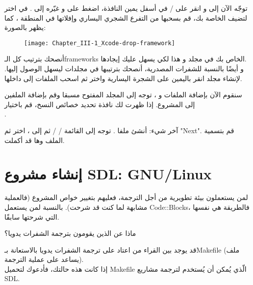 توجّه الآن إلى 
و انقر على 
 / 
في أسفل يمين النافذة، اضغط على 
و غيّره إلى 
.
في 
اختر
لتضيف الخاصة بك، قم بسحبها من التفرع الشجري اليساري وإفلاتها في المنطقة
،
كما يظهر بالصورة:

\begin{figure}[H]
	\centering
	\texttt{[image: Chapter\_III-1\_Xcode-drop-framework]}
\end{figure}

أنصحك بترتيب كل الـ\textenglish{frameworks}
الخاص بك في مجلد 
و هذا لكي يسهل عليك إيجادها.\\
و أيضًا بالنسبة للشفرات المصدرية، أنصحك بترتيبها في مجلدات ليسهل الوصول إليها. لإنشاء مجلد انقر باليمين على الشجرة اليسارية واختر
ثم اسحب الملفات إلى داخلها.

سنقوم الآن بإضافة الملفات
و 
،
توجه إلى المجلد 
المفتوح مسبقا وقم بإضافة الملفين إلى المشروع. إذا ظهرت لك نافذة تحديد خصائص النسخ، قم باختيار\\
.

آخر شيء: أنشئ ملفا
.
توجه إلى القائمة 
 /  / 
ثم إلى 
، 
اختر
ثم
"\textenglish{Next}".
قم بتسمية الملف وها قد أكملت.

\section{إنشاء مشروع \textenglish{SDL}:  \textenglish{GNU/Linux}}

لمن يستعملون بيئة تطويرية من أجل الترجمة، فعليهم بتغيير خواص المشروع (فالعملية مشابهة لما كنت قد شرحت). بالنسبة لمن يستعمل
\textenglish{Code::Blocks}،
فالطريقة هي نفسها التي شرحتها سابقًا.

\begin{question}
 ماذا عن الذين يقومون بترجمة الشفرات يدويا؟
\end{question}

قد يوجد بين القراء من اعتاد على ترجمة الشفرات يدويا بالاستعانة بـ\textenglish{Makefile}
(ملف يساعد على عملية الترجمة).\\
إذا كانت هذه حالتك، فأدعوك لتحميل
\textenglish{Makefile}
الّذي يُمكن أن يُستخدم لترجمة مشاريع \textenglish{SDL}.

